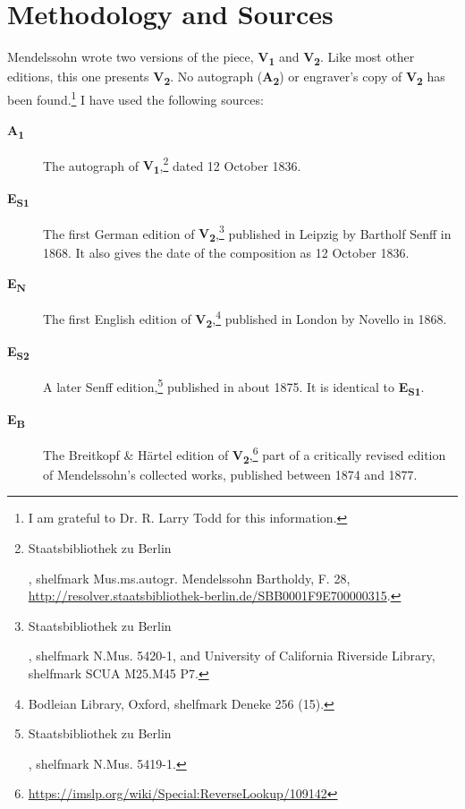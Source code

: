 \documentclass[a4paper, 12pt]{book}
\newcommand{\source}[2]{\textbf{#1\textsubscript{#2}}}
\begin{document}
\ifdef{\critical}
  {%
    \section*{Methodology and Sources}

    Mendelssohn wrote two versions of the piece, \source{V}{1} and
    \source{V}{2}. Like most other editions, this one presents
    \source{V}{2}. No autograph (\source{A}{2}) or engraver's copy of
    \source{V}{2} has been found.\footnote{I am grateful to
      Dr. R. Larry Todd for this information.} I have used the
    following sources:
    
    \begin{description}
    \item[\source{A}{1}] The autograph of
      \source{V}{1},\footnote{\begin{otherlanguage}{ngerman}Staatsbibliothek
          zu Berlin\end{otherlanguage}, shelfmark
          Mus.ms.autogr. Mendelssohn Bartholdy, F. 28,
          \url{http://resolver.staatsbibliothek-berlin.de/SBB0001F9E700000315}.}
      dated 12 October 1836.
    \item[\source{E}{S1}] The first German edition of
      \source{V}{2},\footnote{\begin{otherlanguage}{ngerman}Staatsbibliothek
          zu Berlin\end{otherlanguage}, shelfmark N.Mus. 5420-1, and
          University of California Riverside Library, shelfmark SCUA
          M25.M45 P7.} published in Leipzig by Bartholf Senff in
      1868. It also gives the date of the composition as 12 October
      1836.
    \item[\source{E}{N}] The first English edition of
      \source{V}{2},\footnote{Bodleian Library, Oxford, shelfmark Deneke 256 (15).%
      } published in London by Novello
      in 1868.
    \item[\source{E}{S2}] A later Senff
      edition,\footnote{\begin{otherlanguage}{ngerman}Staatsbibliothek
          zu Berlin\end{otherlanguage}, shelfmark N.Mus. 5419-1.}
      published in about 1875. It is identical to \source{E}{S1}.
    \item[\source{E}{B}] The Breitkopf \& Härtel edition of
      \source{V}{2},\footnote{\url{https://imslp.org/wiki/Special:ReverseLookup/109142}}
      part of a critically revised edition of Mendelssohn's collected
      works, published between 1874 and 1877.
    \end{description}

}
\end{document}
